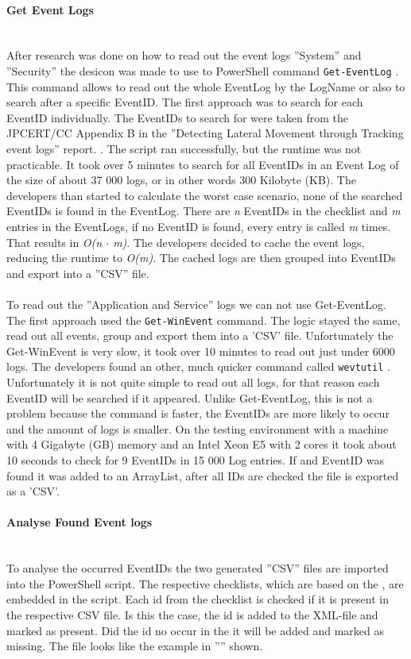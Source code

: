 \paragraph{Get Event Logs}\ \\
After research was done on how to read out the event logs ''System'' and ''Security'' the desicon was made to use to PowerShell command \lstinline|Get-EventLog| \cite{Get-EventLogs}. This command allows to read out the whole EventLog by the LogName or also to search after a specific EventID. The first approach was to search for each EventID individually. The EventIDs to search for were taken from the JPCERT/CC Appendix B in the ''Detecting Lateral Movement through Tracking event logs'' report. \cite{JPCERTDetectingLateralMovement}. The script ran successfully, but the runtime was not practicable. It took over 5 minutes to search for all EventIDs in an Event Log of the size of about 37 000 logs, or  in other words 300 Kilobyte (KB). The developers than started to calculate the worst case scenario,  none of the searched EventIDs is found in the EventLog. There are \textit{n} EventIDs in the checklist and \textit{m} entries in the EventLogs, if no EventID is found, every entry is called \textit{m} times. That results in \textit{O(n $\cdot$ m)}. The developers decided to cache the event logs, reducing the runtime to \textit{O(m)}. The cached logs are then grouped into EventIDs and export into a ''CSV'' file. \ \\
\ \\
To read out the ''Application and Service'' logs we can not use Get-EventLog. The first approach used the \lstinline|Get-WinEvent| \cite{Get-WinEvent} command. The logic stayed the same, read out all events, group and export them into a 'CSV' file. Unfortunately the Get-WinEvent is very slow, it took over 10 minutes to read out just under 6000 logs.
The developers found an other, much quicker command called \lstinline|wevtutil| \cite{wevtutil}. Unfortunately it is not quite simple to read out all logs, for that reason each EventID will be searched if it appeared. Unlike Get-EventLog, this is not a problem because the command is faster, the EventIDs are more likely to occur and the amount of logs is smaller. On the testing environment with a machine with 4 Gigabyte (GB) memory and an Intel Xeon E5 with 2 cores it took about 10 seconds to check for 9 EventIDs in 15 000 Log entries. If and EventID was found it was added to an ArrayList, after all IDs are checked the file is exported as a 'CSV'.
\paragraph{Analyse Found Event logs} \ \\
To analyse the occurred EventIDs the two generated ''CSV'' files are imported into the PowerShell script. The respective checklists, which are based on the , are embedded in the script. Each id from the checklist is checked if it is present in the respective CSV file. Is this the case, the id is added to the XML-file and marked as present. Did the id no occur in the it will be added and marked as missing. The file looks like the example in '''' shown.
\clearpage

